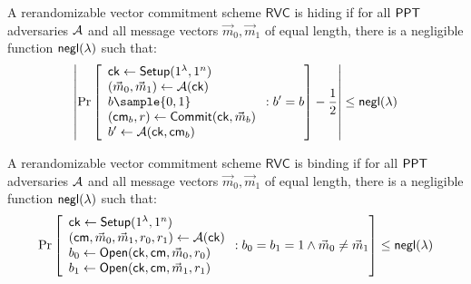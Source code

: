 \begin{definition}[Hiding] A rerandomizable vector commitment scheme $\mathsf{RVC}$ is hiding if for all $\mathsf{PPT}$ adversaries $\mathcal{A}$ and all message vectors $\vec{m}_0, \vec{m}_1$ of equal length, there is a negligible function ${\mathsf{negl}(\lambda)}$ such that:
\[
    \left |
        \Pr
            \left [
                \begin{array}{l}
                    \mathsf{ck} \gets \mathsf{Setup}(1^\lambda, 1^n) \\
                    (\vec{m}_0, \vec{m}_1) \gets \mathcal{A}(\mathsf{ck}) \\
                    b \sample \bit \\
                    (\cm_b, r) \gets \mathsf{Commit}(\mathsf{ck}, \vec{m}_b) \\
                    b' \gets \Adv(\mathsf{ck}, \cm_b) \\
                \end{array}
                : b' = b
                \right ]
                - \frac{1}{2}
    \right | \leq \negl
\]
\end{definition}


\begin{definition}[Binding] A rerandomizable vector commitment scheme $\mathsf{RVC}$ is binding if for all $\mathsf{PPT}$ adversaries $\mathcal{A}$ and all message vectors $\vec{m}_0, \vec{m}_1$ of equal length, there is a negligible function ${\mathsf{negl}(\lambda)}$ such that:
    \[
        \Pr
        \left [
            \begin{array}{l}
            \mathsf{ck} \gets \mathsf{Setup}(1^\lambda, 1^n) \\
            (\mathsf{cm}, \vec{m}_0, \vec{m}_1, r_0, r_1) \gets \mathcal{A}(\mathsf{ck}) \\
            b_0 \gets \mathsf{Open}(\mathsf{ck}, \mathsf{cm}, \vec{m}_0, r_0) \\
            b_1 \gets \mathsf{Open}(\mathsf{ck}, \mathsf{cm}, \vec{m}_1, r_1) \\
            \end{array}
            : b_0 = b_1 = 1 \land \vec{m}_0 \neq  \vec{m}_1
        \right ] \leq {\mathsf{negl}(\lambda)}
    \]
\end{definition}


